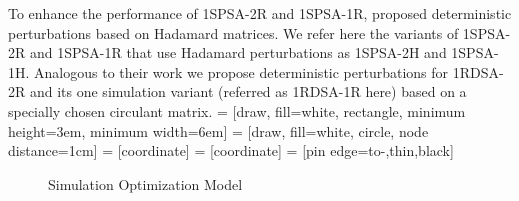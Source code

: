 \documentclass[letterpaper, 10 pt, conference]{ieeeconf}  %
\begin{document}
To enhance the performance of 1SPSA-2R and 1SPSA-1R, \cite{bhatnagar2003two}
proposed deterministic perturbations based on Hadamard matrices.
We refer here the variants of 1SPSA-2R and 1SPSA-1R that use Hadamard perturbations as
1SPSA-2H and 1SPSA-1H. Analogous to their work we propose deterministic perturbations
for 1RDSA-2R and its  one simulation variant (referred as 1RDSA-1R here) based on a
specially chosen circulant matrix.
 = [draw, fill=white, rectangle,
   minimum height=3em, minimum width=6em]
 = [draw, fill=white, circle, node distance=1cm]
 = [coordinate]
 = [coordinate]
 = [pin edge={to-,thin,black}]
\begin{figure}[t]
    \centering
{}
\caption{Simulation Optimization Model}
\label{fig:so}
\end{figure}
\end{document}
